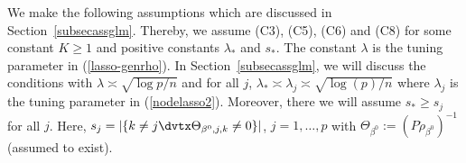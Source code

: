 \documentclass[aos,MSNbibl,dvips]{arximspdf}
\newcommand{\PP}{\mathbb{P}}
\begin{document}
We make the following assumptions which are discussed in
Section~\ref{subsecassglm}. Thereby, we assume (C3), (C5), (C6) and (C8)
for some constant $K \ge1$ and positive constants $\lambda_*$ and $s_*$.
The constant $\lambda$ is the tuning parameter in (\ref{lasso-genrho}).
In Section~\ref{subsecassglm}, we will discuss the conditions
with $\lambda\asymp\sqrt{\log p / n }$ and for all $j$, $\lambda_*
\asymp\lambda_j \asymp
\sqrt{\log(p) / n } $ where $\lambda_j$ is the tuning parameter in
(\ref{nodelasso2}).
Moreover, there we will assume $s_* \ge s_j$ for all $j$. Here, $s_j =
| \{ k\neq j \dvtx \Theta_{\beta^0, j, k } \neq0 \} | $, $j=1, \ldots,
p$ with $\Theta_{\beta^0}:= ( P \ddot\rho_{\beta^0 } )^{-1}$ (assumed
to exist).
%
\end{document}
